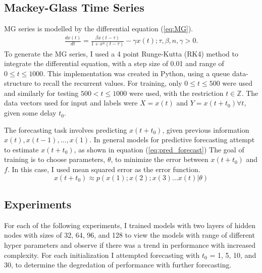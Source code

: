 \documentclass[11pt]{article}
\newcommand{\Z}{\mathbb{Z}}
\begin{document}
\subsection {Mackey-Glass Time Series}
MG series is modelled by the differential equation (\ref{eq:MG}).
\begin{equation}
  \begin{split}
\frac{dx(t)}{dt} = \frac{\beta x(t-\tau)}{1+x^n(t- \tau)} - \gamma x(t); \tau,\beta,n,\gamma > 0.
\label{eq:MG}
  \end{split}
\end{equation}
To generate the MG series, I used a 4 point Runge-Kutta (RK4) method to
integrate the differential equation, with a step size of
0.01 and range of $0 \leq t \leq 1000$. This implementation was created in Python, using a queue
data-structure to recall the recurrent values. For training, only
$0 \leq t \leq 500$ were used and similarly for testing 
$500 < t \leq 1000$  were used, with the restriction $t \in \Z$. The data vectors used
for input and labels were $X = x(t) $ and $ Y = x(t+t_0) \forall
t$, given some delay $t_0$. 

The forecasting task involves predicting $x(t+t_0)$, given previous
information $x(t), x(t-1), ..., x(1)$. In general models for predictive forecasting
attempt to estimate $x(t+t_0)$, as shown in equation
(\ref{eq:pred_forecast}) The goal of training is to 
choose parameters, $\theta$, to minimize the error between $x(t+t_0)$
and $f$. In this case, I used mean squared error as the error function.
\begin{equation}
  x(t+t_0) \approx p(x(1);x(2);x(3)...x(t) | \theta)
  \label{eq:pred_forecast}
\end{equation}

\subsection{Experiments}
For each of the following
experiments, I
trained models with two layers of hidden nodes with sizes of 32, 64, 96, and 128 to
view the models with range of different hyper parameters and observe if
there was a trend in performance with increased complexity. For each
initialization I attempted forecasting with $t_0$ = 1, 5, 10, and 30,
to determine the degredation of performance with further forecasting.
\end{document}
